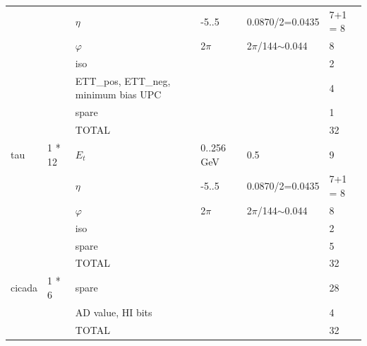 \documentclass{cmspaper}
\begin{document}
\begin{table}[ht]
\begin{tabular}{| l | l | l | l | l | l |}
	&		&	$\eta$	&	-5..5	&	0.0870/2=0.0435	&	7+1 = 8                    \\
	&		&	$\varphi$	&	2$\pi$	&	2$\pi$/144$\sim$0.044	&	8                    \\
	&		&	iso	&		&		&	2                    \\
	&		&	ETT\_pos, ETT\_neg, minimum bias UPC	&		&		&	4                    \\
	&		&	spare	&		&		&	1                    \\
	&		&	TOTAL	&		&		&	32                    \\
\hline
tau	&	1 * 12	&	$E_t$	&	0..256 GeV	&	0.5	&	9                    \\
	&		&	$\eta$	&	-5..5	&	0.0870/2=0.0435	&	7+1 = 8                    \\
	&		&	$\varphi$	&	2$\pi$	&	2$\pi$/144$\sim$0.044	&	8                    \\
	&		&	iso	&		&		&	2                    \\
	&		&	spare	&		&		&	5                    \\
	&		&	TOTAL	&		&		&	32                    \\
\hline
cicada	&	1 * 6	&	spare	&		&		&	28                    \\
	&		&	AD value, HI bits	&		&		&	4                    \\
	&		&	TOTAL	&		&		&	32                    \\
\hline
\end{tabular}
\label{table:scales_table_1}
\end{table}
\end{document}
